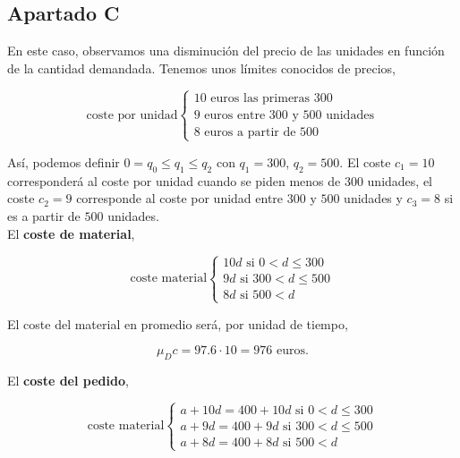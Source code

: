 \documentclass[a4paper,12pt]{article}
\begin{document}
\subsection{Apartado C}

En este caso, observamos una disminuci\'on del precio de las unidades en funci\'on de la cantidad demandada. Tenemos unos l\'imites conocidos de precios,
     
	\begin{equation*}
	\text{coste por unidad}  \left\lbrace \begin{array}{l}	  
		10\text{ euros} \text{ las primeras 300}\\
		9\text{ euros}  \text{ entre 300 y 500 unidades}\\
		8\text{ euros}  \text{ a partir de 500}
	\end{array}
	\right. 
	\end{equation*}
	
As\'i, podemos definir $0 = q_0 \leq q_1 \leq q_2$ con $q_1 = 300$, $q_2 = 500$. El coste $c_1 = 10$ corresponder\'a al coste por unidad cuando se piden menos de $300$ unidades, el coste $c_2 = 9$ corresponde al coste por unidad entre $300$ y $500$ unidades y $c_3 = 8$ si es a partir de $500$ unidades.\\

El \textbf{coste de material},

\begin{equation*}
\text{coste material} \left\lbrace \begin{array}{l}
	10d \text{ si } 0 < d \leq 300\\
	9d  \text{ si } 300 < d \leq 500 \\
	8d  \text{ si } 500 < d
\end{array}
	\right.
\end{equation*}

El coste del material en promedio ser\'a, por unidad de tiempo, 

$$ \mu_D c = 97.6 \cdot 10 = 976\text{ euros.}$$ 

El \textbf{coste del pedido},

\begin{equation*}
\text{coste material} \left\lbrace \begin{array}{l}
	a + 10d = 400 + 10d \text{ si } 0 < d \leq 300\\
	a + 9d  = 400 + 9d  \text{ si } 300 < d \leq 500 \\
	a + 8d  = 400 + 8d  \text{ si } 500 < d
\end{array}
	\right.
\end{equation*}
\end{document}
